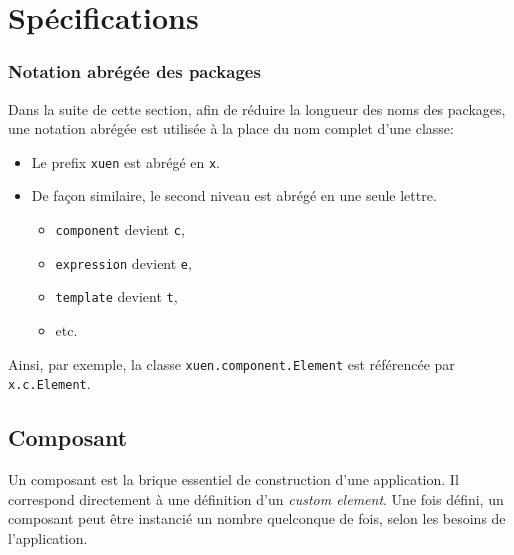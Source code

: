 \section{Spécifications} \label{sec:web-specs}

\subsubsection{Notation abrégée des packages}
Dans la suite de cette section, afin de réduire la longueur des noms des packages, une notation abrégée est utilisée à la place du nom complet d'une classe:
\begin{itemize}
	\item Le prefix \texttt{xuen} est abrégé en \texttt{x}.
	\item De façon similaire, le second niveau est abrégé en une seule lettre.
	\begin{itemize}
		\item \texttt{component} devient \texttt{c},
		\item \texttt{expression} devient \texttt{e},
		\item \texttt{template} devient \texttt{t},
		\item etc.
	\end{itemize}
\end{itemize}
Ainsi, par exemple, la classe \texttt{xuen.component.Element} est référencée par \texttt{x.c.Element}.

\subsection{Composant} \label{sec:web-usage-component}

Un composant est la brique essentiel de construction d'une application. Il correspond directement à une définition d'un \emph{custom element}. Une fois défini, un composant peut être instancié un nombre quelconque de fois, selon les besoins de l'application.

